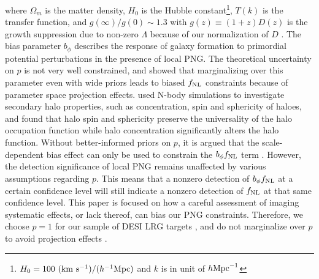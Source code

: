 where $\Omega_{m}$ is the matter density, $H_{0}$ is the Hubble constant\footnote{$H_{0}=100~({\rm km}~{\rm s}^{-1})/(h^{-1}{\rm Mpc})$ and $k$ is in unit of $h {\rm Mpc}^{-1}$}, $T(k)$ is the transfer function, and $g(\infty)/g(0) \sim 1.3$ with $g(z)\equiv (1+z) D(z)$ is the growth suppression due to non-zero $\Lambda$ because of our normalization of $D$ \citep[see, e.g.,][]{2010JCAP...07..013R, 2019MNRAS.485.4160M}. The bias parameter $b_{\phi}$ describes the response of galaxy formation to primordial potential perturbations in the presence of local PNG.   The theoretical uncertainty on $p$ is not very well constrained, and \cite{2022JCAP...11..013B} showed that marginalizing over this parameter even with wide priors leads to biased $f_{\rm NL}$ constraints because of parameter space projection effects. \cite{2023JCAP...01..023L} used N-body simulations to investigate secondary halo properties, such as concentration, spin and sphericity of haloes, and found that halo spin and sphericity preserve the universality of the halo occupation function while halo concentration significantly alters the halo function. Without better-informed priors on $p$, it is argued that the scale-dependent bias effect can only  be used to constrain the $b_{\phi}f_{\rm NL}$ term \citep[see, e.g.,][]{2020JCAP...12..013B, 2020JCAP...12..031B}. However, the detection significance of local PNG remains unaffected by various assumptions regarding $p$. This means that a nonzero detection of $b_{\phi}f_{\rm NL}$ at a certain confidence level will still indicate a nonzero detection of $f_{\rm NL}$ at that same confidence level. This paper is focused on how a careful assessment of imaging systematic effects, or lack thereof, can bias our PNG constraints. Therefore, we choose $p=1$ for our sample of DESI LRG targets \citep[see, also,][]{slosar2008constraints,2010JCAP...07..013R,2013MNRAS.428.1116R}, and do not marginalize over $p$ to avoid projection effects \citep{2022JCAP...11..013B}.

